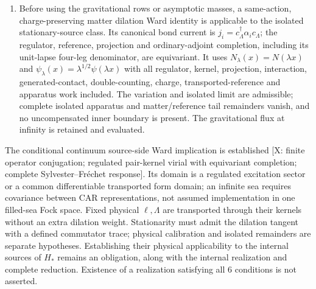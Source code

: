\begin{enumerate}[label=(\arabic*)]
 \item Before using the gravitational rows or asymptotic masses, a
 same-action, charge-preserving matter dilation Ward identity is
 applicable to the isolated stationary-source class.  Its canonical
 bond current is $j_i=c_\Lambda^\dagger\alpha_i c_\Lambda$;
 the regulator, reference, projection and ordinary-adjoint
 completion, including its unit-lapse four-leg denominator, are
 equivariant.  It uses
 $N_\lambda(x)=N(\lambda x)$ and
 $\psi_\lambda(x)=\lambda^{1/2}\psi(\lambda x)$ with all regulator,
 kernel, projection, interaction, generated-contact, double-counting, charge,
 transported-reference and apparatus work included.  The variation
 and isolated limit are admissible; complete isolated apparatus and
 matter/reference tail remainders vanish, and no uncompensated inner
 boundary is present.
 The gravitational flux at infinity is retained and evaluated.
\end{enumerate}
The conditional continuum source-side Ward implication is established
[X: finite operator conjugation; regulated pair-kernel virial with
equivariant completion; complete Sylvester--Fr\'echet response].
Its domain is a regulated excitation sector or a common
differentiable transported form domain; an infinite sea requires
covariance between CAR representations, not assumed implementation
in one filled-sea Fock space.  Fixed physical $\ell,\Lambda$ are
transported through their kernels without an extra dilation weight.
Stationarity must admit the dilation tangent with a defined
commutator trace; physical calibration and isolated remainders are
separate hypotheses.  Establishing their
physical applicability to the internal sources of $H_*$ remains an
obligation, along with the internal realization and complete reduction.
Existence of a realization satisfying all 6 conditions is not asserted.

